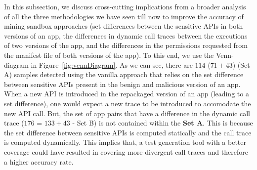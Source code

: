 
In this subsection, we discuss cross-cutting implications from a broader analysis of all the three methodologies we have seen till now to improve the accuracy of mining sandbox approaches (set differences between the sensitive APIs in both versions of an app, the differences in dynamic call traces between the executions of two versions of the app, and the differences in the permissions requested from the manifest file of both versions of the app). To this end, we use the Venn-diagram in Figure~\ref{fig:vennDiagram}.  As we can see, there are $114$ ($71+43$) (Set A) samples detected using the vanilla approach that relies on the set difference between sensitive APIs present in the benign and malicious version of an app. When a new API is introduced in the repackaged version of an app (leading to a set difference), one would expect a new trace to be introduced to accomodate the new API call. But, the set of app pairs that have a difference in the dynamic call trace ($176$ = $133+43$ - Set B) is not contained within the \textbf{Set A}. This is because the set difference between sensitive APIs is computed statically and the call trace is computed dynamically. This implies that, a test generation tool with a better coverage could have resulted in covering more divergent call traces and therefore a higher accuracy rate.



